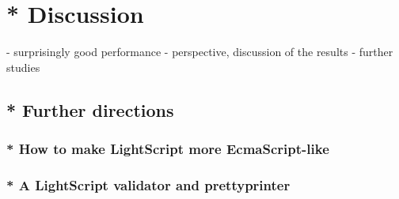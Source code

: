 \chapter{* Discussion}
\label{discussion}
  - surprisingly good performance
    - perspective, discussion of the results
      - further studies

\section{* Further directions}
\subsection{* How to make LightScript more EcmaScript-like}
\subsection{* A LightScript validator and prettyprinter}
